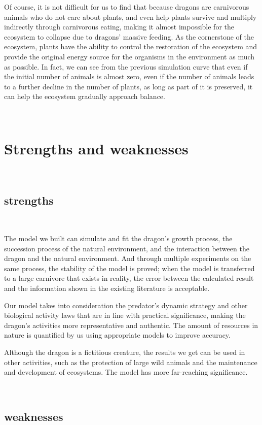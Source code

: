 \documentclass{mcmthesis}
\begin{document}
Of course, it is not difficult for us to find that because dragons are carnivorous animals who do not care about plants, and even help plants survive and multiply indirectly through carnivorous eating, making it almost impossible for the ecosystem to collapse due to dragons’ massive feeding. As the cornerstone of the ecosystem, plants have the ability to control the restoration of the ecosystem and provide the original energy source for the organisms in the environment as much as possible. In fact, we can see from the previous simulation curve that even if the initial number of animals is almost zero, even if the number of animals leads to a further decline in the number of plants, as long as part of it is preserved, it can help the ecosystem gradually approach balance.




~\ \
\section{Strengths and weaknesses}
~\ \

\subsection{strengths}
~\ \

The model we built can simulate and fit the dragon's growth process, the succession process of the natural environment, and the interaction between the dragon and the natural environment. And through multiple experiments on the same process, the stability of the model is proved; when the model is transferred to a large carnivore that exists in reality, the error between the calculated result and the information shown in the existing literature is acceptable.

Our model takes into consideration the predator’s dynamic strategy and other biological activity laws that are in line with practical significance, making the dragon’s activities more representative and authentic. The amount of resources in nature is quantified by us using appropriate models to improve accuracy.

Although the dragon is a fictitious creature, the results we get can be used in other activities, such as the protection of large wild animals and the maintenance and development of ecosystems. The model has more far-reaching significance.

~\ \
\subsection{weaknesses}
~\ \
\end{document}
